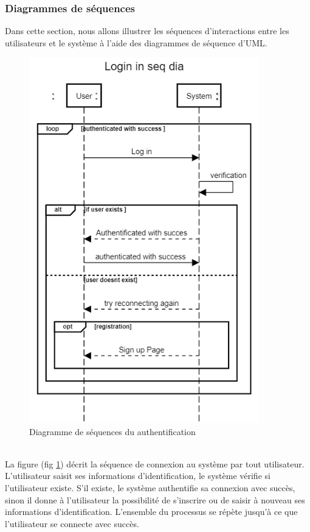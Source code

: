\documentclass[french, a4paper, 12pt]{report}
\begin{document}
			
			\newpage
		\subsubsection{Diagrammes de séquences} Dans cette section, nous allons illustrer les séquences d'interactions entre les utilisateurs et le système à l'aide des diagrammes de séquence d'UML.
			\begin{figure}[h!]
  				\center
  				\includegraphics[width=10cm]{seqlogin.png}
  				\caption{Diagramme de séquences du authentification}
  				\label{fig:seqlogin}
			\end{figure} \\La figure (fig \ref{fig:seqlogin}) décrit la séquence de connexion au système par tout utilisateur. L'utilisateur saisit ses informations d'identification, le système vérifie si l'utilisateur existe. S'il existe, le système authentifie sa connexion avec succès, sinon il donne à l'utilisateur la possibilité de s'inscrire ou de saisir à nouveau ses informations d'identification. L'ensemble du processus se répète jusqu'à ce que l'utilisateur se connecte avec succès.
			
\end{document}
